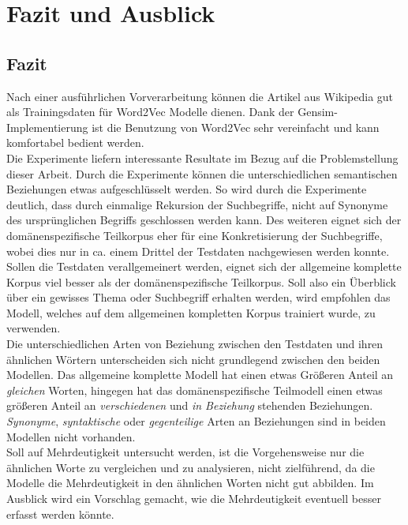 \documentclass[12pt,a4paper]{report}
\begin{document}
\newpage
\chapter{Fazit und Ausblick}
\section{Fazit}
Nach einer ausführlichen Vorverarbeitung können die Artikel aus Wikipedia gut als Trainingsdaten für Word2Vec Modelle dienen. Dank der Gensim-Implementierung ist die Benutzung von Word2Vec sehr vereinfacht und kann komfortabel bedient werden.\\
Die Experimente liefern interessante Resultate im Bezug auf die Problemstellung dieser Arbeit. Durch die Experimente können die unterschiedlichen semantischen Beziehungen etwas aufgeschlüsselt werden.
So wird durch die Experimente deutlich, dass durch einmalige Rekursion der Suchbegriffe, nicht auf Synonyme des ursprünglichen Begriffs geschlossen werden kann. Des weiteren eignet sich der domänenspezifische Teilkorpus eher für eine Konkretisierung der Suchbegriffe, wobei dies nur in ca. einem Drittel der Testdaten nachgewiesen werden konnte. \\
Sollen die Testdaten verallgemeinert werden, eignet sich der allgemeine komplette Korpus viel besser als der domänenspezifische Teilkorpus. Soll also ein Überblick über ein gewisses Thema oder Suchbegriff erhalten werden, wird empfohlen das Modell, welches auf dem allgemeinen kompletten Korpus trainiert wurde, zu verwenden.\\
Die unterschiedlichen Arten von Beziehung zwischen den Testdaten und ihren ähnlichen Wörtern unterscheiden sich nicht grundlegend zwischen den beiden Modellen. Das allgemeine komplette Modell hat einen etwas Größeren Anteil an \textit{gleichen} Worten, hingegen hat das domänenspezifische Teilmodell einen etwas größeren Anteil an \textit{verschiedenen} und \textit{in Beziehung} stehenden Beziehungen. \textit{Synonyme}, \textit{syntaktische} oder \textit{gegenteilige} Arten an Beziehungen sind in beiden Modellen nicht vorhanden.\\
Soll auf Mehrdeutigkeit untersucht werden, ist die Vorgehensweise nur die ähnlichen Worte zu vergleichen und zu analysieren, nicht zielführend, da die Modelle die Mehrdeutigkeit in den ähnlichen Worten nicht gut abbilden. Im Ausblick wird ein Vorschlag gemacht, wie die Mehrdeutigkeit eventuell besser erfasst werden könnte.\\
\end{document}
